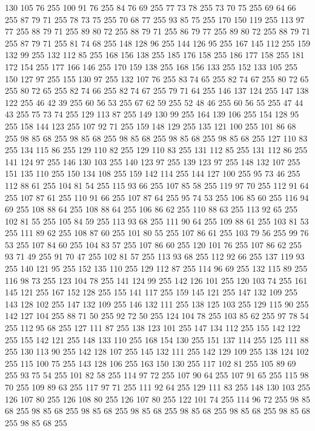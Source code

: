 130 105 76 255 100 91 76 255 84 76 69 255 77 73 78 255 73 70 75 255 69 64 66 255 87 79 71 255 78 73 75 255 70 68 77 255 93 85 75 255 170 150 119 255 113 97 77 255 88 79 71 255 89 80 72 255 88 79 71 255 86 79 77 255 89 80 72 255 88 79 71 255 87 79 71 255 81 74 68 255 148 128 96 255 144 126 95 255 167 145 112 255 159 132 99 255 132 112 85 255 168 156 138 255 185 176 158 255 186 177 158 255 181 172 154 255 177 166 146 255 170 159 138 255 168 156 133 255 152 133 105 255 150 127 97 255 155 130 97 255 132 107 76 255 83 74 65 255 82 74 67 255 80 72 65 255 80 72 65 255 82 74 66 255 82 74 67 255 79 71 64 255 146 137 124 255 147 138 122 255 46 42 39 255 60 56 53 255 67 62 59 255 52 48 46 255 60 56 55 255 47 44 43 255 75 73 74 255 129 113 87 255 149 130 99 255 164 139 106 255 154 128 95 255 158 144 123 255 107 92 71 255 159 148 129 255 135 121 100 255 101 86 68 255 98 85 68 255 98 85 68 255 98 85 68 255
98 85 68 255 98 85 68 255 127 110 83 255 134 115 86 255 129 110 82 255 129 110 83 255 131 112 85 255 131 112 86 255 141 124 97 255 146 130 103 255 140 123 97 255 139 123 97 255 148 132 107 255 151 135 110 255 150 134 108 255 159 142 114 255 144 127 100 255 95 73 46 255 112 88 61 255 104 81 54 255 115 93 66 255 107 85 58 255 119 97 70 255 112 91 64 255 107 87 61 255 110 91 66 255 107 87 64 255 95 74 53 255 106 85 60 255 116 94 69 255 108 88 64 255 108 88 64 255 106 86 62 255 110 88 63 255 113 92 65 255 102 81 55 255 105 84 59 255 113 93 68 255 111 90 64 255 109 88 61 255 103 81 53 255 111 89 62 255 108 87 60 255 101 80 55 255 107 86 61 255 103 79 56 255 99 76 53 255 107 84 60 255 104 83 57 255 107 86 60 255 120 101 76 255 107 86 62 255 93 71 49 255 91 70 47 255 102 81 57 255 113 93 68 255 112 92 66 255 137 119 93 255 140 121 95 255 152 135 110 255 129 112 87 255 114 96 69 255 132 115 89 255 116 98 73 255
123 104 78 255 141 124 99 255 142 126 101 255 120 103 74 255 161 145 121 255 167 152 128 255 155 141 117 255 159 145 121 255 147 132 109 255 143 128 102 255 147 132 109 255 146 132 111 255 138 125 103 255 129 115 90 255 142 127 104 255 88 71 50 255 92 72 50 255 124 104 78 255 103 85 62 255 97 78 54 255 112 95 68 255 127 111 87 255 138 123 101 255 147 134 112 255 155 142 122 255 155 142 121 255 148 133 110 255 168 154 130 255 151 137 114 255 125 111 88 255 130 113 90 255 142 128 107 255 145 132 111 255 142 129 109 255 138 124 102 255 115 100 75 255 143 128 106 255 163 150 130 255 117 102 81 255 105 89 69 255 93 75 54 255 101 82 58 255 114 97 72 255 107 90 64 255 107 91 65 255 115 98 70 255 109 89 63 255 117 97 71 255 111 92 64 255 129 111 83 255 148 130 103 255 126 107 80 255 126 108 80 255 126 107 80 255 122 101 74 255 114 96 72 255 98 85 68 255 98 85 68 255 98 85 68 255 98 85 68 255 98 85 68 255 98 85 68 255 98 85 68 255 98 85 68 255
